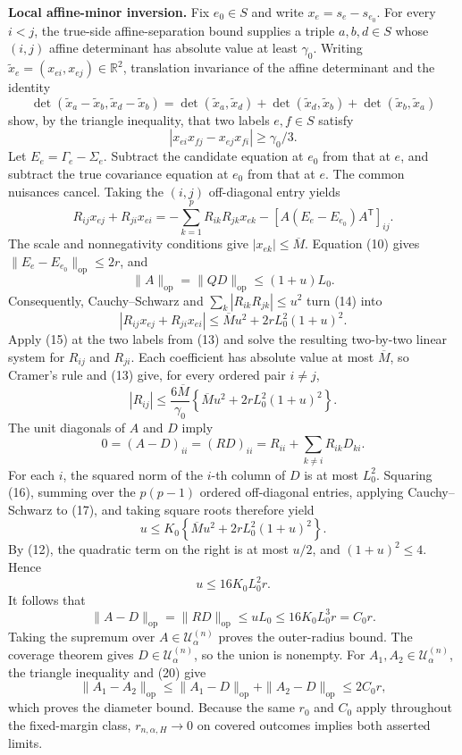\textbf{Local affine-minor inversion.}
Fix \(e_0\in S\) and write \(x_e=s_e-s_{e_0}\). For every \(i<j\), the true-side affine-separation bound supplies a triple \(a,b,d\in S\) whose \((i,j)\) affine determinant has absolute value at least \(\gamma_0\). Writing \(\widetilde x_e=(x_{ei},x_{ej})\in\mathbb R^2\), translation invariance of the affine determinant and the identity
\[
\det(\widetilde x_a-\widetilde x_b,
\widetilde x_d-\widetilde x_b)
=\det(\widetilde x_a,\widetilde x_d)
+\det(\widetilde x_d,\widetilde x_b)
+\det(\widetilde x_b,\widetilde x_a)
\]
show, by the triangle inequality, that two labels \(e,f\in S\) satisfy
\[
|x_{ei}x_{fj}-x_{ej}x_{fi}|\geq\gamma_0/3.
\tag{13}
\]
Let \(E_e=\Gamma_e-\Sigma_e\). Subtract the candidate equation at \(e_0\) from that at \(e\), and subtract the true covariance equation at \(e_0\) from that at \(e\). The common nuisances cancel. Taking the \((i,j)\) off-diagonal entry yields
\[
R_{ij}x_{ej}+R_{ji}x_{ei}
=-\sum_{k=1}^pR_{ik}R_{jk}x_{ek}
-[A(E_e-E_{e_0})A^{\mathsf T}]_{ij}.
\tag{14}
\]
The scale and nonnegativity conditions give \(|x_{ek}|\leq\overline M\). Equation (10) gives \(\|E_e-E_{e_0}\|_{\mathrm{op}}\leq2r\), and
\[
\|A\|_{\mathrm{op}}=\|QD\|_{\mathrm{op}}
\leq(1+u)L_0.
\]
Consequently, Cauchy--Schwarz and \(\sum_k|R_{ik}R_{jk}|\leq u^2\) turn (14) into
\[
|R_{ij}x_{ej}+R_{ji}x_{ei}|
\leq\overline M u^2+2rL_0^2(1+u)^2.
\tag{15}
\]
Apply (15) at the two labels from (13) and solve the resulting two-by-two linear system for \(R_{ij}\) and \(R_{ji}\). Each coefficient has absolute value at most \(\overline M\), so Cramer's rule and (13) give, for every ordered pair \(i\neq j\),
\[
|R_{ij}|
\leq\frac{6\overline M}{\gamma_0}
\left\{\overline M u^2+2rL_0^2(1+u)^2\right\}.
\tag{16}
\]
The unit diagonals of \(A\) and \(D\) imply
\[
0=(A-D)_{ii}=(RD)_{ii}
=R_{ii}+\sum_{k\neq i}R_{ik}D_{ki}.
\tag{17}
\]
For each \(i\), the squared norm of the \(i\)-th column of \(D\) is at most \(L_0^2\). Squaring (16), summing over the \(p(p-1)\) ordered off-diagonal entries, applying Cauchy--Schwarz to (17), and taking square roots therefore yield
\[
u\leq K_0
\left\{\overline M u^2+2rL_0^2(1+u)^2\right\}.
\tag{18}
\]
By (12), the quadratic term on the right is at most \(u/2\), and \((1+u)^2\leq4\). Hence
\[
u\leq16K_0L_0^2r.
\tag{19}
\]
It follows that
\[
\|A-D\|_{\mathrm{op}}
=\|RD\|_{\mathrm{op}}
\leq uL_0
\leq16K_0L_0^3r
=C_0r.
\tag{20}
\]
Taking the supremum over \(A\in\mathcal U^{(n)}_\alpha\) proves the outer-radius bound. The coverage theorem gives \(D\in\mathcal U^{(n)}_\alpha\), so the union is nonempty. For \(A_1,A_2\in\mathcal U^{(n)}_\alpha\), the triangle inequality and (20) give
\[
\|A_1-A_2\|_{\mathrm{op}}
\leq\|A_1-D\|_{\mathrm{op}}+\|A_2-D\|_{\mathrm{op}}
\leq2C_0r,
\]
which proves the diameter bound. Because the same \(r_0\) and \(C_0\) apply throughout the fixed-margin class, \(r_{n,\alpha,H}\to0\) on covered outcomes implies both asserted limits.
